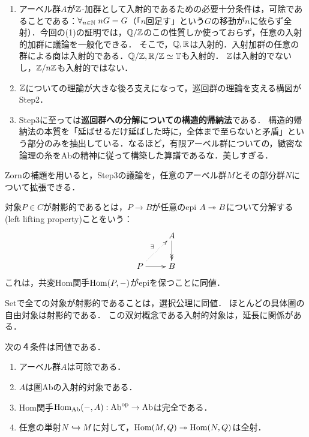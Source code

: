 \documentclass[uplatex,dvipdfmx]{jsreport}
\begin{document}
\begin{remarks}[アーベル圏の様子とアーベル群の巡回群構造についての構造的帰納法]\mbox{}
    \begin{enumerate}
        \item アーベル群$A$が$\mathbb{Z}$-加群として入射的であるための必要十分条件は，可除であることである：$\forall_{n\in\mathbb{N}}\;nG=G$（「$n$回足す」という$G$の移動が$n$に依らず全射）．今回の(1)の証明では，$\mathbb{Q}/\mathbb{Z}$のこの性質しか使っておらず，任意の入射的加群に議論を一般化できる．
        そこで，$\mathbb{Q},\mathbb{R}$は入射的．入射加群の任意の群による商は入射的である．$\mathbb{Q}/\mathbb{Z},\mathbb{R}/\mathbb{Z}\simeq\mathbb{T}$も入射的．
        $\mathbb{Z}$は入射的でないし，$\mathbb{Z}/n\mathbb{Z}$も入射的ではない．
        \item $\mathbb{Z}$についての理論が大きな後ろ支えになって，巡回群の理論を支える構図がStep2．
        \item Step3に至っては\textbf{巡回群への分解についての構造的帰納法}である．
        構造的帰納法の本質を「延ばせるだけ延ばした時に，全体まで至らないと矛盾」という部分のみを抽出している．なるほど，有限アーベル群についての，緻密な論理の糸をAbの精神に従って構築した算譜であるな．美しすぎる．
    \end{enumerate}
\end{remarks}
\begin{remark}
    Zornの補題を用いると，Step3の議論を，任意のアーベル群$M$とその部分群$N$について拡張できる．
\end{remark}

\begin{definition}
    対象$P\in C$が射影的であるとは，$P\to B$が任意のepi $A\twoheadrightarrow B$について分解する(left lifting property)ことをいう：
    \[\xymatrix{
        &A\ar@{->>}[d]\\
        P\ar@{.>}[ur]^-{\exists}\ar[r]&B
    }\]
    これは，共変Hom関手$\mathrm{Hom}(P,-)$がepiを保つことに同値．
\end{definition}
\begin{remark}
    Setで全ての対象が射影的であることは，選択公理に同値．
    ほとんどの具体圏の自由対象は射影的である．
    この双対概念である入射的対象は，延長に関係がある．
\end{remark}

\begin{proposition}[入射的対象の特徴付け]
    次の４条件は同値である．
    \begin{enumerate}
        \item アーベル群$A$は可除である．
        \item $A$は圏Abの入射的対象である．
        \item Hom関手$\mathrm{Hom}_{\mathrm{Ab}}(-,A):\mathrm{Ab}^{\mathrm{op}}\to\mathrm{Ab}$は完全である．
        \item 任意の単射$N\hookrightarrow M$に対して，$\mathrm{Hom}(M,Q)\twoheadrightarrow\mathrm{Hom}(N,Q)$は全射．
    \end{enumerate}
\end{proposition}
\end{document}
